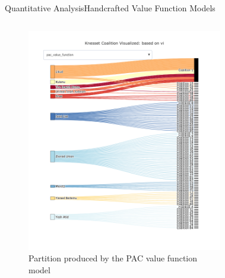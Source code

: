 \documentclass[xcolor=dvipsnames]{beamer}
\begin{document}
\begin{frame}{Quantitative Analysis}{Handcrafted Value Function Models}
  \small
  \begin{columns}
  \begin{figure}
    \includegraphics[width=\linewidth]{value_function_pac}
    \caption[Partition visualization: PAC value function model]{Partition produced by the PAC value function model}
  \end{figure}
  \begin{figure}

\end{figure}
\end{columns}
\end{frame}
\end{document}
